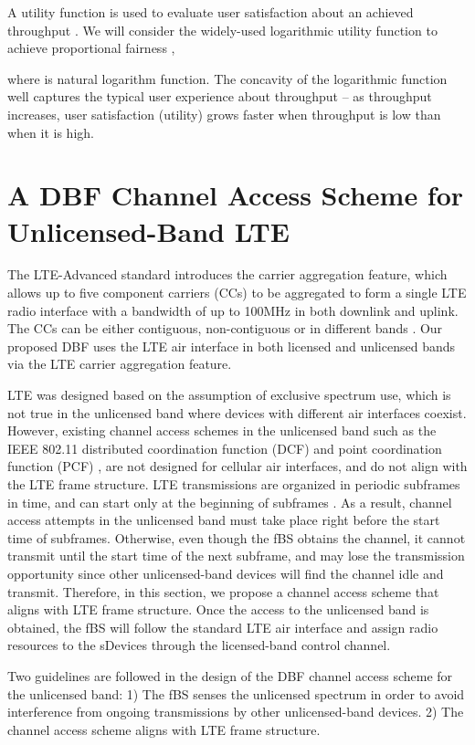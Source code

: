 \documentclass[journal,final,letterpaper,10pt,doublecolumn,twoside]{IEEEtran}
\begin{document}
A utility function  is used to evaluate user satisfaction about an achieved throughput . We will consider the widely-used logarithmic  utility function  to achieve proportional fairness \cite{log_utility},

where  is natural logarithm function. The concavity of the logarithmic  function well captures the typical user experience about throughput -- as throughput increases, user satisfaction (utility) grows faster when throughput is low than when it is high.




\section{A DBF Channel Access Scheme for Unlicensed-Band LTE}\label{sec: ch-access-scheme}
The LTE-Advanced standard \cite{LTE-A} introduces the carrier aggregation feature, which allows up to five component carriers (CCs) to be aggregated to form a single LTE radio interface with a bandwidth of up to 100MHz in both downlink and uplink. The CCs can be either contiguous, non-contiguous or in different bands \cite{LTE-A}.
Our proposed DBF uses the LTE air interface in both licensed and unlicensed bands via the LTE carrier aggregation feature.

LTE was designed based on the assumption of exclusive spectrum use,
which is not true in the unlicensed band where devices with
different air interfaces coexist. However, existing channel access
schemes in the unlicensed band such as the IEEE 802.11 distributed
coordination function (DCF) and point coordination function (PCF)
\cite{802.11-2007}, are not designed for cellular air interfaces,
and do not align with the LTE frame structure. LTE transmissions are
organized in periodic subframes in time, and can start only at the
beginning of subframes \cite{LTE-A}. As a result, channel access
attempts in the unlicensed band must take place right before the
start time of subframes. Otherwise, even though the fBS obtains the
channel, it cannot transmit until the start time of the next
subframe, and may lose the transmission opportunity since other
unlicensed-band devices will find the channel idle and transmit.
Therefore, in this section, we propose a channel access scheme that
aligns with LTE frame structure. Once the access to the unlicensed
band is obtained, the fBS will follow the standard LTE air interface and
assign radio resources to the sDevices through the licensed-band control
channel.

Two guidelines are followed in the design of the DBF channel access scheme for the unlicensed band: 1) The fBS senses the unlicensed spectrum in order to avoid interference from ongoing transmissions by other unlicensed-band devices.  2) The channel access scheme aligns with LTE frame structure.
\end{document}
